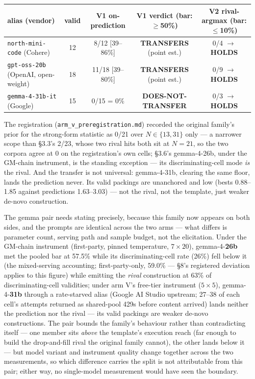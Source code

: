 \begin{center}
\footnotesize
\setlength{\tabcolsep}{3.5pt}
\begin{tabular}{@{}lcccc@{}}
\toprule
alias (vendor) & valid & V1 on-prediction & V1 verdict (bar: $\ge$50\%) & V2 rival-argmax (bar: $\le$10\%) \\
\midrule
\texttt{north-mini-code} (Cohere) & 12 & 8/12 [39--86\%] & \textbf{TRANSFERS} (point est.) & 0/4 $\rightarrow$ \textbf{HOLDS} \\
\texttt{gpt-oss-20b} (OpenAI, open-weight) & 18 & 11/18 [39--80\%] & \textbf{TRANSFERS} (point est.) & 0/9 $\rightarrow$ \textbf{HOLDS} \\
\texttt{gemma-4-31b-it} (Google) & 15 & 0/15 = 0\% & \textbf{DOES-NOT-TRANSFER} & 0/3 $\rightarrow$ \textbf{HOLDS} \\
\bottomrule
\end{tabular}
\end{center}

The registration (\texttt{arm\_v\_preregistration.md}) recorded the original family's prior for the
strong-form statistic as 0/21 over $N \in \{13, 31\}$ only --- a narrower scope than \S3.3's 2/23,
whose two rival hits both sit at $N = 21$, so the two corpora agree at 0 on the registration's own
cells; \S3.6's gemma-4-26b, under the GM-chain instrument, is the standing exception --- its
discriminating-cell mode \emph{is} the rival. And the transfer is not universal: gemma-4-31b,
clearing the same floor, lands the prediction never. Its valid packings are unanchored and low
(bests 0.88--1.85 against predictions 1.63--3.03) --- not the rival, not the template, just weaker
de-novo construction.

The gemma pair needs stating precisely, because this family now appears on both sides, and
the prompts are identical across the two arms --- what differs is parameter count, serving
path and sample budget, not the elicitation. Under the GM-chain instrument (first-party,
pinned temperature, $7 \times 20$), gemma-4-\textbf{26b} met the pooled bar at 57.5\% while its discriminating-cell rate (26\%) fell below it (the mixed-serving
accounting; first-party-only, 59.0\% --- \S8's registered deviation applies to this figure)
while emitting the \emph{rival} construction at 63\% of discriminating-cell validities; under arm
V's free-tier instrument ($5 \times 5$), gemma-4-\textbf{31b} through a rate-starved alias (Google AI
Studio upstream; 27--38 of each cell's attempts returned as shared-pool 429s before content
arrived) lands neither the prediction nor the rival --- its valid packings are weaker de-novo
constructions. The pair bounds the family's behaviour rather than contradicting itself ---
one member sits \emph{above} the template's execution reach (far enough to build the
drop-and-fill rival the original family cannot), the other lands below it --- but model
variant and instrument quality change together across the two measurements, so which
difference carries the split is not attributable from this pair; either way, no
single-model measurement would have seen the boundary.

